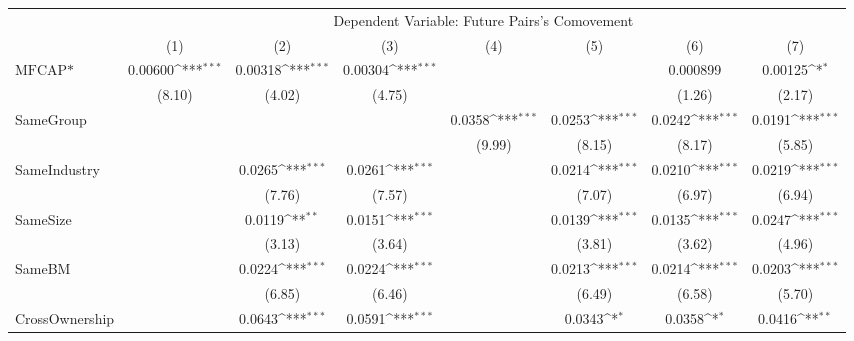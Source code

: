 {
\def\sym#1{\ifmmode^{#1}\else\(^{#1}\)\fi}
\begin{tabular}{l*{7}{c}}
\hline\hline
                &\multicolumn{7}{c}{Dependent Variable:  Future Pairs's Comovement}                                                                  \\\cmidrule(lr){2-8}
                &\multicolumn{1}{c}{(1)}         &\multicolumn{1}{c}{(2)}         &\multicolumn{1}{c}{(3)}         &\multicolumn{1}{c}{(4)}         &\multicolumn{1}{c}{(5)}         &\multicolumn{1}{c}{(6)}         &\multicolumn{1}{c}{(7)}         \\
\hline
$ \text{MFCAP*} $&  0.00600\sym{***}&  0.00318\sym{***}&  0.00304\sym{***}&                  &                  & 0.000899         &  0.00125\sym{*}  \\
                &   (8.10)         &   (4.02)         &   (4.75)         &                  &                  &   (1.26)         &   (2.17)         \\
[1em]
SameGroup       &                  &                  &                  &   0.0358\sym{***}&   0.0253\sym{***}&   0.0242\sym{***}&   0.0191\sym{***}\\
                &                  &                  &                  &   (9.99)         &   (8.15)         &   (8.17)         &   (5.85)         \\
[1em]
SameIndustry    &                  &   0.0265\sym{***}&   0.0261\sym{***}&                  &   0.0214\sym{***}&   0.0210\sym{***}&   0.0219\sym{***}\\
                &                  &   (7.76)         &   (7.57)         &                  &   (7.07)         &   (6.97)         &   (6.94)         \\
[1em]
SameSize        &                  &   0.0119\sym{**} &   0.0151\sym{***}&                  &   0.0139\sym{***}&   0.0135\sym{***}&   0.0247\sym{***}\\
                &                  &   (3.13)         &   (3.64)         &                  &   (3.81)         &   (3.62)         &   (4.96)         \\
[1em]
SameBM          &                  &   0.0224\sym{***}&   0.0224\sym{***}&                  &   0.0213\sym{***}&   0.0214\sym{***}&   0.0203\sym{***}\\
                &                  &   (6.85)         &   (6.46)         &                  &   (6.49)         &   (6.58)         &   (5.70)         \\
[1em]
CrossOwnership  &                  &   0.0643\sym{***}&   0.0591\sym{***}&                  &   0.0343\sym{*}  &   0.0358\sym{*}  &   0.0416\sym{**} \\

\end{tabular}}
